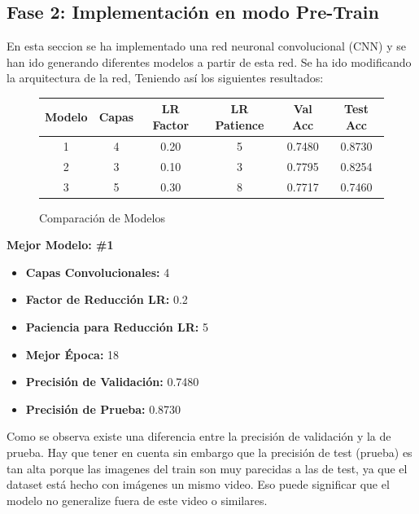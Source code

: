 
\subsection{Fase 2: Implementación en modo Pre-Train}

\noindent
En esta seccion se ha implementado una red neuronal convolucional (CNN) y se han
ido generando diferentes modelos a partir de esta red. Se ha ido modificando la arquitectura de la red,
Teniendo así los siguientes resultados:


\begin{figure}[H]
    \centering
    \begin{tabular}{|c|c|c|c|c|c|}
        \hline
        \textbf{Modelo} & \textbf{Capas} & \textbf{LR Factor} & \textbf{LR Patience} & \textbf{Val Acc} & \textbf{Test Acc} \\ \hline
        1 & 4 & 0.20 & 5 & 0.7480 & 0.8730 \\ \hline
        2 & 3 & 0.10 & 3 & 0.7795 & 0.8254 \\ \hline
        3 & 5 & 0.30 & 8 & 0.7717 & 0.7460 \\ \hline
    \end{tabular}
    \caption{Comparación de Modelos}
\end{figure}

\begin{center}
    \textbf{Mejor Modelo: \#1}
\end{center}

\begin{itemize}
    \item \textbf{Capas Convolucionales:} 4
    \item \textbf{Factor de Reducción LR:} 0.2
    \item \textbf{Paciencia para Reducción LR:} 5
    \item \textbf{Mejor Época:} 18
    \item \textbf{Precisión de Validación:} 0.7480
    \item \textbf{Precisión de Prueba:} 0.8730
\end{itemize}

\quad

\noindent
Como se observa existe una diferencia entre la precisión de validación y la de prueba.
Hay que tener en cuenta sin embargo que la precisión de test (prueba) es tan alta porque
las imagenes del train son muy parecidas a las de test, ya que el dataset está hecho con imágenes
un mismo video. Eso puede significar que el modelo no generalize fuera de este video o similares.


